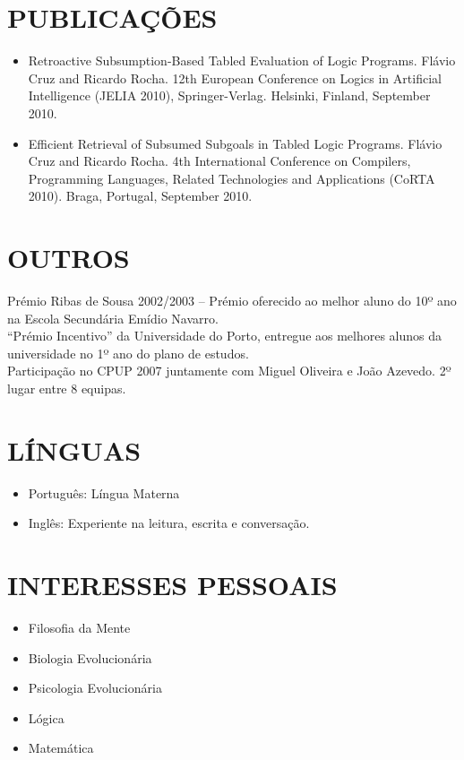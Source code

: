 \documentclass[margin]{res}
\begin{document}
\begin{resume}
\section{PUBLICAÇÕES}
   \begin{itemize}
      \item Retroactive Subsumption-Based Tabled Evaluation of Logic Programs.
      Flávio Cruz and Ricardo Rocha. 12th European Conference on Logics in Artificial Intelligence (JELIA 2010), Springer-Verlag. Helsinki, Finland, September 2010.
      \item Efficient Retrieval of Subsumed Subgoals in Tabled Logic Programs.
      Flávio Cruz and Ricardo Rocha. 4th International Conference on Compilers, Programming Languages, Related Technologies and Applications (CoRTA 2010). Braga, Portugal, September 2010.
   \end{itemize}

             
\section{OUTROS} Prémio Ribas de Sousa 2002/2003 – Prémio oferecido ao melhor aluno do 10º ano na Escola
                  Secundária Emídio Navarro. \\
                  “Prémio Incentivo” da Universidade do Porto, entregue aos melhores alunos da universidade
                  no 1º ano do plano de estudos. \\
                  Participação no CPUP 2007 juntamente com Miguel Oliveira e João Azevedo. 2º lugar entre 8 equipas. \\
                      
\section{LÍNGUAS}
      \begin{itemize}
        \item Português: Língua Materna
        \item Inglês: Experiente na leitura, escrita e conversação.
      \end{itemize}
      
\section{INTERESSES PESSOAIS}

   \begin{itemize}
      \item Filosofia da Mente
      \item Biologia Evolucionária
      \item Psicologia Evolucionária
      \item Lógica
      \item Matemática  
   \end{itemize}
 
\end{resume}
\end{document}
